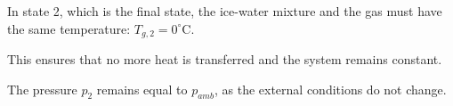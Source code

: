 In state 2, which is the final state, the ice-water mixture and the gas must have the same temperature:  
\( T_{g,2} = 0^\circ \text{C} \).  

This ensures that no more heat is transferred and the system remains constant.  

The pressure \( p_2 \) remains equal to \( p_{amb} \), as the external conditions do not change.